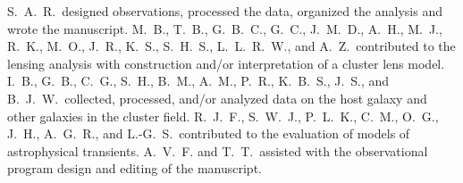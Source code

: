 S.~A.~R.~designed observations, processed the \HST data, organized the
analysis and wrote the manuscript.  M.~B., T.~B., G.~B.~C., G.~C.,
J.~M.~D., A.~H., M.~J., R.~K., M.~O., J.~R., K.~S., S.~H.~S.,
L.~L.~R.~W., and A.~Z.~contributed to the lensing analysis with
construction and/or interpretation of a cluster lens model.  I.~B.,
G.~B., C.~G., S.~H., B.~M., A.~M., P.~R., K.~B.~S., J.~S., and
B.~J.~W.~collected, processed, and/or analyzed data on the host galaxy
and other galaxies in the cluster field.  R.~J.~F., S.~W.~J.,
P.~L.~K., C.~M., O.~G., J.~H., A.~G.~R., and L.-G.~S.~contributed to
the evaluation of models of astrophysical transients. A.~V.~F. and
T.~T.~assisted with the observational program design and editing of
the manuscript.













